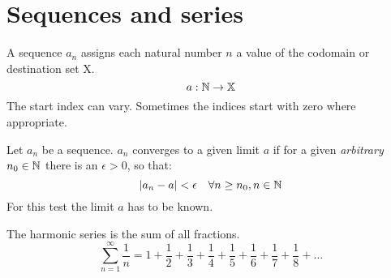 \chapter{Sequences and series}

\begin{definition}[Sequence]
    A sequence $a_n$ assigns each natural number $n$ a value of the codomain or destination set X.
    \begin{equation}
        a:\mathbb{N} \rightarrow \mathbb{X}
    \end{equation}
    The start index can vary. Sometimes the indices start with zero where appropriate.
\end{definition}

\begin{definition}
    Let $a_n$ be a sequence. 
    $a_n$ converges to a given limit $a$ if for a given \emph{arbitrary} $n_0 \in \mathbb{N}$ 
    there is an $\epsilon>0$, so that:
    \begin{equation}
        |a_n - a| < \epsilon \quad \forall n \ge n_0, n \in \mathbb{N}
    \end{equation}
    For this test the limit $a$ has to be known.
\end{definition}

\begin{definition}
    The harmonic series is the sum of all fractions.
    \begin{equation}
        \sum_{n=1}^{\infty}\frac{1}{n} = 
            1 + 
            \frac{1}{2} + 
            \frac{1}{3} + \frac{1}{4} + 
            \frac{1}{5} + \frac{1}{6} + \frac{1}{7} + \frac{1}{8} + ...
    \end{equation}
\end{definition}

